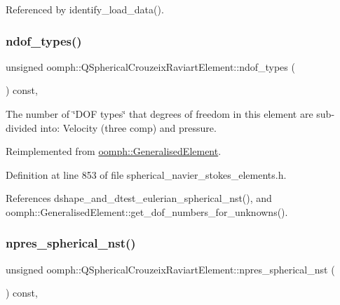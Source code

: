 Referenced by identify\+\_\+load\+\_\+data().

\mbox{\label{classoomph_1_1QSphericalCrouzeixRaviartElement_af9984dcf9685e350ebb1173a511c9594}} 
\subsubsection{\texorpdfstring{ndof\+\_\+types()}{ndof\_types()}}
{\footnotesize\ttfamily unsigned oomph\+::\+Q\+Spherical\+Crouzeix\+Raviart\+Element\+::ndof\+\_\+types (\begin{DoxyParamCaption}{ }\end{DoxyParamCaption}) const\hspace{0.3cm}{\ttfamily [inline]}, {\ttfamily [virtual]}}



The number of \char`\"{}\+D\+O\+F types\char`\"{} that degrees of freedom in this element are sub-\/divided into\+: Velocity (three comp) and pressure. 



Reimplemented from \hyperlink{classoomph_1_1GeneralisedElement_a0c6037a870597b35dcf1c780710b9a56}{oomph\+::\+Generalised\+Element}.



Definition at line 853 of file spherical\+\_\+navier\+\_\+stokes\+\_\+elements.\+h.



References dshape\+\_\+and\+\_\+dtest\+\_\+eulerian\+\_\+spherical\+\_\+nst(), and oomph\+::\+Generalised\+Element\+::get\+\_\+dof\+\_\+numbers\+\_\+for\+\_\+unknowns().

\mbox{\label{classoomph_1_1QSphericalCrouzeixRaviartElement_adefc160b9cedb7638a265e4c37f2e237}} 
\subsubsection{\texorpdfstring{npres\+\_\+spherical\+\_\+nst()}{npres\_spherical\_nst()}}
{\footnotesize\ttfamily unsigned oomph\+::\+Q\+Spherical\+Crouzeix\+Raviart\+Element\+::npres\+\_\+spherical\+\_\+nst (\begin{DoxyParamCaption}{ }\end{DoxyParamCaption}) const\hspace{0.3cm}{\ttfamily [inline]}, {\ttfamily [virtual]}}



